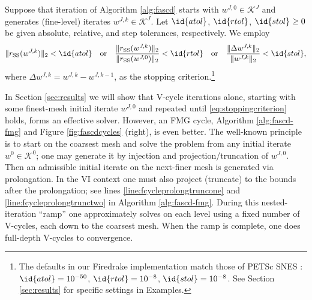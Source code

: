 \documentclass[review,hidelinks,onefignum,onetabnum]{siamart220329}
\newcommand{\rSS}{r_{\text{SS}}}
\begin{document}
Suppose that iteration of Algorithm \ref{alg:fascd} starts with $w^{J,0} \in \mathcal{K}^J$ and generates (fine-level) iterates $w^{J,k} \in \mathcal{K}^J$.  Let $\id{atol}$, $\id{rtol}$, $\id{stol} \ge 0$ be given absolute, relative, and step tolerances, respectively.  We employ
\begin{equation}
\|\rSS(w^{J,k})\|_2 < \id{atol} \quad \text{or} \quad \frac{\|\rSS(w^{J,k})\|_2}{\|\rSS(w^{J,0})\|_2} < \id{rtol} \quad \text{or} \quad \frac{\|\Delta w^{J,k}\|_2}{\|w^{J,k}\|_2} < \id{stol}, \label{eq:stoppingcriterion}
\end{equation}
where $\Delta w^{J,k} = w^{J,k} -  w^{J,k-1}$, as the stopping criterion.\footnote{The defaults in our Firedrake implementation match those of PETSc SNES \cite{Balayetal2023}: $\id{atol}=10^{-50}$, $\id{rtol}=10^{-8}$, $\id{stol}=10^{-8}$.  See Section \ref{sec:results} for specific settings in Examples.}

In Section \ref{sec:results} we will show that V-cycle iterations alone, starting with some finest-mesh initial iterate $w^{J,0}$ and repeated until \eqref{eq:stoppingcriterion} holds, forms an effective solver.  However, an FMG cycle, Algorithm \ref{alg:fascd-fmg} and Figure \ref{fig:fascdcycles} (right), is even better.  The well-known principle \cite[section 2.6]{Trottenbergetal2001} is to start on the coarsest mesh and solve the problem from any initial iterate $w^0\in\mathcal{K}^0$; one may generate it by injection and projection/truncation of $w^{J,0}$.  Then an admissible initial iterate on the next-finer mesh is generated via prolongation.  In the VI context one must also project (truncate) to the bounds after the prolongation; see lines \ref{line:fcycleprolongtruncone} and \ref{line:fcycleprolongtrunctwo} in Algorithm \ref{alg:fascd-fmg}.  During this nested-iteration ``ramp'' one approximately solves on each level using a fixed number of V-cycles, each down to the coarsest mesh.  When the ramp is complete, one does full-depth V-cycles to convergence.
\end{document}
